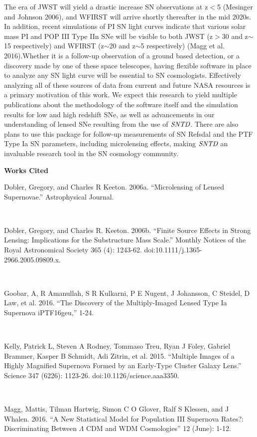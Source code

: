The era of JWST will yield a drastic increase SN observations at z$<$5 (Mesinger and Johnson 2006), and WFIRST will arrive shortly thereafter in the mid 2020s. In addition, recent simulations of PI SN light curves indicate that various solar mass PI and POP III Type IIn SNe will be visible to both JWST (z$>$30 and z$\sim$15 respectively) and WFIRST (z$\sim$20 and z$\sim$5 respectively) (Magg et al. 2016).Whether it is a follow-up observation of a ground based detection, or a discovery made by one of these space telescopes, having flexible software in place to analyze any SN light curve will be essential to SN cosmologists. Effectively analyzing all of these sources of data from current and future NASA resources is a primary motivation of this work. We expect this research to yield multiple publications about the methodology of the software itself and the simulation results for low and high redshift SNe, as well as advancements in our understanding of lensed SNe resulting from the use of $\textit{SNTD}$. There are also plans to use this package for follow-up measurements of SN Refsdal and the PTF Type Ia SN parameters, including microlensing effects, making $\textit{SNTD}$ an invaluable research tool in the SN cosmology community. 

\pagebreak

\textbf{Works Cited}

Dobler, Gregory, and Charles R Keeton. 2006a. ``Microlensing of Lensed Supernovae.'' Astrophysical Journal.

\

Dobler, Gregory, and Charles R. Keeton. 2006b. ``Finite Source Effects in Strong Lensing: Implications for the Substructure Mass Scale.'' Monthly Notices of the Royal Astronomical Society 365 (4): 1243-62. doi:10.1111/j.1365-2966.2005.09809.x.

\

Goobar, A, R Amanullah, S R Kulkarni, P E Nugent, J Johansson, C Steidel, D Law, et al. 2016. ``The Discovery of the Multiply-Imaged Lensed Type Ia Supernova iPTF16geu,'' 1-24.

\

Kelly, Patrick L, Steven A Rodney, Tommaso Treu, Ryan J Foley, Gabriel Brammer, Kasper B Schmidt, Adi Zitrin, et al. 2015. ``Multiple Images of a Highly Magnified Supernova Formed by an Early-Type Cluster Galaxy Lens.'' Science 347 (6226): 1123-26. doi:10.1126/science.aaa3350.

\

Magg, Mattis, Tilman Hartwig, Simon C O Glover, Ralf S Klessen, and J Whalen. 2016. ``A New Statistical Model for Population III Supernova Rates?: Discriminating Between $\Lambda$ CDM and WDM Cosmologies'' 12 (June): 1-12.

